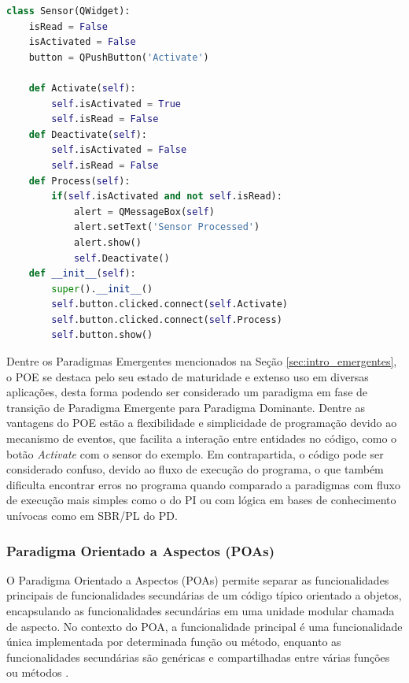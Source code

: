 \begin{lstlisting}[language = Python, float=htb,
  caption = {Exemplo de aplicação de sensor com PyQt5 no POE},
  source = {Autoria própria},
  label = {cod:qt_event}]
class Sensor(QWidget):
    isRead = False
    isActivated = False
    button = QPushButton('Activate')
    
    def Activate(self):
        self.isActivated = True
        self.isRead = False    
    def Deactivate(self):
        self.isActivated = False
        self.isRead = False          
    def Process(self):
        if(self.isActivated and not self.isRead):
            alert = QMessageBox(self)
            alert.setText('Sensor Processed')
            alert.show()
            self.Deactivate()    
    def __init__(self):
        super().__init__()
        self.button.clicked.connect(self.Activate)
        self.button.clicked.connect(self.Process)
        self.button.show()
\end{lstlisting}

Dentre os Paradigmas Emergentes mencionados na Seção \ref{sec:intro_emergentes},
o POE se destaca pelo seu estado de maturidade e extenso uso em diversas
aplicações, desta forma podendo ser considerado um paradigma em fase de
transição de Paradigma Emergente para Paradigma Dominante. Dentre as vantagens
do POE estão a flexibilidade e simplicidade de programação devido ao mecanismo
de eventos, que facilita a interação entre entidades no código, como o botão
\textit{Activate} com o sensor do exemplo. Em contrapartida, o código pode ser
considerado confuso, devido ao fluxo de execução do programa, o que também
dificulta encontrar erros no programa quando comparado a paradigmas com fluxo de
execução mais simples como o do PI ou com lógica em bases de conhecimento
unívocas como em SBR/PL do PD. 

\subsubsection{Paradigma Orientado a Aspectos (POAs)}

O Paradigma Orientado a Aspectos (POAs) permite separar as funcionalidades
principais de funcionalidades secundárias de um código típico orientado a
objetos, encapsulando as funcionalidades secundárias em uma unidade modular
chamada de aspecto. No contexto do POA, a funcionalidade principal é uma
funcionalidade única implementada por determinada função ou método, enquanto as
funcionalidades secundárias são genéricas e compartilhadas entre várias funções
ou métodos \cite{laddad_2003}.

